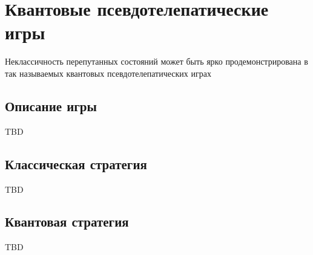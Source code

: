 \section{Квантовые псевдотелепатические игры}

Неклассичность перепутанных состояний может быть ярко
продемонстрирована в так называемых квантовых псевдотелепатических играх
\cite{bPseudoTelepathy2003}

\subsection{Описание игры}
TBD

\subsection{Классическая стратегия}
TBD

\subsection{Квантовая стратегия}
TBD
